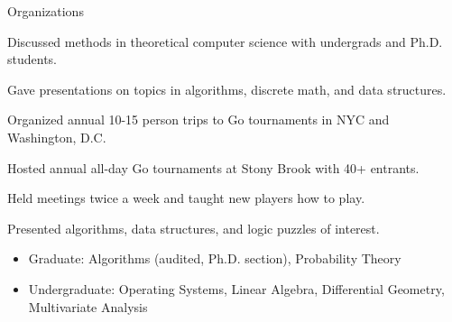 \documentclass{cv}
\begin{document}
\begin{cvsection}{Organizations}
  {
    \item Discussed methods in theoretical computer science with undergrads and Ph.D. students.
    \item Gave presentations on topics in algorithms, discrete math, and data structures.
  }
  {
    \item Organized annual 10-15 person trips to Go tournaments in NYC and Washington, D.C.
    \item Hosted annual all-day Go tournaments at Stony Brook with 40+ entrants.
    \item Held meetings twice a week and taught new players how to play.
  }
  {
    \item Presented algorithms, data structures, and logic puzzles of interest.
  } 
\end{cvsection}

\begin{minipage}{\textwidth}
  \begin{itemize}[noitemsep,topsep=0pt]%
    \item Graduate: Algorithms (audited, Ph.D. section), Probability Theory
    \item Undergraduate: Operating Systems, Linear Algebra, Differential Geometry, Multivariate Analysis
  \end{itemize}%
\end{minipage}%
\end{document}
